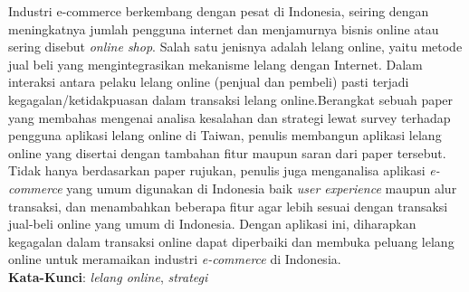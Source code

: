 \begin{abstrak}
		Industri e-commerce berkembang dengan pesat di Indonesia, seiring dengan meningkatnya jumlah pengguna internet dan menjamurnya bisnis online atau sering disebut \textit{online shop}. Salah satu jenisnya adalah lelang online, yaitu metode jual beli yang mengintegrasikan mekanisme lelang dengan Internet.
	    \newline
	    \indent Dalam interaksi antara pelaku lelang online (penjual dan pembeli) pasti terjadi kegagalan/ketidakpuasan dalam transaksi lelang online.Berangkat sebuah paper yang membahas mengenai analisa kesalahan dan strategi lewat survey terhadap pengguna aplikasi lelang online di Taiwan, penulis membangun aplikasi lelang online yang disertai dengan tambahan fitur maupun saran dari paper tersebut.
	    \newline 
	    \indent Tidak hanya berdasarkan paper rujukan, penulis juga menganalisa aplikasi \textit{e-commerce} yang umum digunakan di Indonesia baik \textit{user experience} maupun alur transaksi, dan menambahkan beberapa fitur agar lebih sesuai dengan transaksi jual-beli online yang umum di Indonesia. Dengan aplikasi ini, diharapkan kegagalan dalam transaksi online dapat diperbaiki dan membuka peluang lelang online untuk meramaikan industri \textit{e-commerce} di Indonesia.\\
\noindent \textbf{Kata-Kunci}: \textit{lelang online}, \textit{strategi }
\end{abstrak}